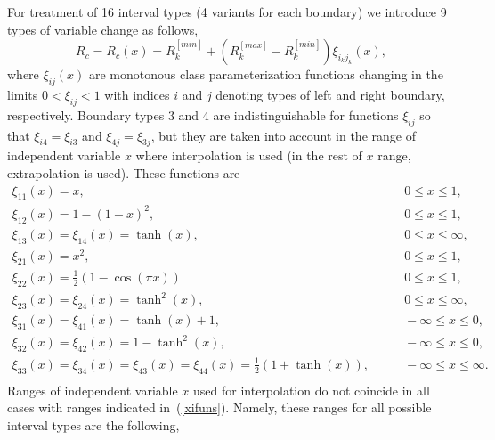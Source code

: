 \documentclass[preprint,prb,aps]{revtex4-1}
\newcommand{\be}[1]{\begin{equation} \label{#1}}
\newcommand{\ee}{\end{equation}}
\newcommand{\eq}[1]{(\ref{#1})}
\begin{document}
For treatment of 16 interval types (4 variants for each boundary) we introduce 9 types
of variable change as follows,
\be{convreg}
R_c=R_c(x)=R^{[min]}_k+\left(R^{[max]}_k-R^{[min]}_k\right) \xi_{i_k j_k}(x),
\ee
where $\xi_{ij}(x)$ are monotonous class parameterization 
functions changing in the limits $0<\xi_{ij}<1$
with indices $i$ and $j$ denoting types of left and right boundary, respectively.
Boundary types 3 and 4 are indistinguishable for functions $\xi_{ij}$ 
so that $\xi_{i4}=\xi_{i3}$ and $\xi_{4j}=\xi_{3j}$, but they
are taken into account in the range of independent variable $x$ where interpolation
is used (in the rest of $x$ range, extrapolation is used). These functions are
\be{xifuns}
\begin{array}{lc}
\xi_{11}(x) = x,                     &\qquad  0\le x \le 1, \\
\xi_{12}(x) = 1-(1-x)^2,             &\qquad  0\le x \le 1, \\  
\xi_{13}(x) = \xi_{14}(x) =\tanh(x), &\qquad  0\le x \le \infty, \\  
\xi_{21}(x) = x^2,                   &\qquad  0\le x \le 1, \\
\xi_{22}(x) = \frac{1}{2}\left(1-\cos(\pi x)\right) 
                                     &\qquad  0\le x \le 1, \\
\xi_{23}(x) = \xi_{24}(x) =\tanh^2(x), &\qquad  0\le x \le \infty, \\  
\xi_{31}(x) = \xi_{41}(x) =\tanh(x)+1, &\qquad  -\infty \le x \le 0, \\  
\xi_{32}(x) = \xi_{42}(x) =1-\tanh^2(x), &\qquad  -\infty \le x \le 0, \\  
\xi_{33}(x) = \xi_{34}(x) = \xi_{43}(x) = \xi_{44}(x) 
=\frac{1}{2}\left(1+\tanh(x)\right), &\qquad  -\infty \le x \le \infty. \\  
\end{array}
\ee
Ranges of independent variable $x$ used for interpolation do not coincide in all
cases with ranges indicated in~\eq{xifuns}. Namely, these ranges for
all possible interval types are the following,
\end{document}
